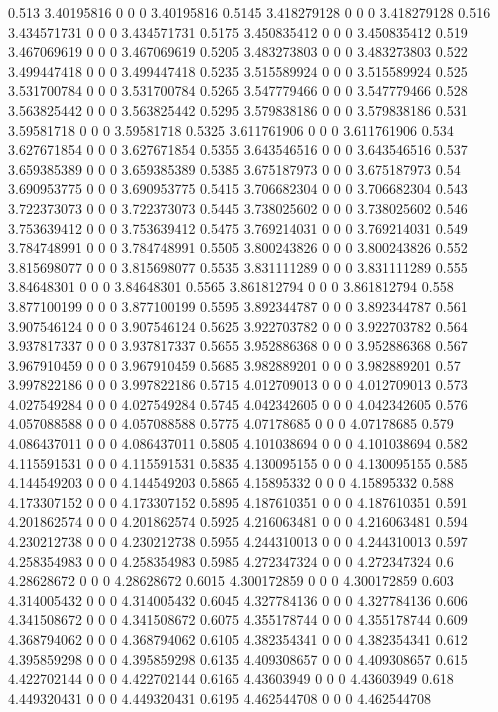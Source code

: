 {0.513 3.40195816 0 0 0 3.40195816
0.5145 3.418279128 0 0 0 3.418279128
0.516 3.434571731 0 0 0 3.434571731
0.5175 3.450835412 0 0 0 3.450835412
0.519 3.467069619 0 0 0 3.467069619
0.5205 3.483273803 0 0 0 3.483273803
0.522 3.499447418 0 0 0 3.499447418
0.5235 3.515589924 0 0 0 3.515589924
0.525 3.531700784 0 0 0 3.531700784
0.5265 3.547779466 0 0 0 3.547779466
0.528 3.563825442 0 0 0 3.563825442
0.5295 3.579838186 0 0 0 3.579838186
0.531 3.59581718 0 0 0 3.59581718
0.5325 3.611761906 0 0 0 3.611761906
0.534 3.627671854 0 0 0 3.627671854
0.5355 3.643546516 0 0 0 3.643546516
0.537 3.659385389 0 0 0 3.659385389
0.5385 3.675187973 0 0 0 3.675187973
0.54 3.690953775 0 0 0 3.690953775
0.5415 3.706682304 0 0 0 3.706682304
0.543 3.722373073 0 0 0 3.722373073
0.5445 3.738025602 0 0 0 3.738025602
0.546 3.753639412 0 0 0 3.753639412
0.5475 3.769214031 0 0 0 3.769214031
0.549 3.784748991 0 0 0 3.784748991
0.5505 3.800243826 0 0 0 3.800243826
0.552 3.815698077 0 0 0 3.815698077
0.5535 3.831111289 0 0 0 3.831111289
0.555 3.84648301 0 0 0 3.84648301
0.5565 3.861812794 0 0 0 3.861812794
0.558 3.877100199 0 0 0 3.877100199
0.5595 3.892344787 0 0 0 3.892344787
0.561 3.907546124 0 0 0 3.907546124
0.5625 3.922703782 0 0 0 3.922703782
0.564 3.937817337 0 0 0 3.937817337
0.5655 3.952886368 0 0 0 3.952886368
0.567 3.967910459 0 0 0 3.967910459
0.5685 3.982889201 0 0 0 3.982889201
0.57 3.997822186 0 0 0 3.997822186
0.5715 4.012709013 0 0 0 4.012709013
0.573 4.027549284 0 0 0 4.027549284
0.5745 4.042342605 0 0 0 4.042342605
0.576 4.057088588 0 0 0 4.057088588
0.5775 4.07178685 0 0 0 4.07178685
0.579 4.086437011 0 0 0 4.086437011
0.5805 4.101038694 0 0 0 4.101038694
0.582 4.115591531 0 0 0 4.115591531
0.5835 4.130095155 0 0 0 4.130095155
0.585 4.144549203 0 0 0 4.144549203
0.5865 4.15895332 0 0 0 4.15895332
0.588 4.173307152 0 0 0 4.173307152
0.5895 4.187610351 0 0 0 4.187610351
0.591 4.201862574 0 0 0 4.201862574
0.5925 4.216063481 0 0 0 4.216063481
0.594 4.230212738 0 0 0 4.230212738
0.5955 4.244310013 0 0 0 4.244310013
0.597 4.258354983 0 0 0 4.258354983
0.5985 4.272347324 0 0 0 4.272347324
0.6 4.28628672 0 0 0 4.28628672
0.6015 4.300172859 0 0 0 4.300172859
0.603 4.314005432 0 0 0 4.314005432
0.6045 4.327784136 0 0 0 4.327784136
0.606 4.341508672 0 0 0 4.341508672
0.6075 4.355178744 0 0 0 4.355178744
0.609 4.368794062 0 0 0 4.368794062
0.6105 4.382354341 0 0 0 4.382354341
0.612 4.395859298 0 0 0 4.395859298
0.6135 4.409308657 0 0 0 4.409308657
0.615 4.422702144 0 0 0 4.422702144
0.6165 4.43603949 0 0 0 4.43603949
0.618 4.449320431 0 0 0 4.449320431
0.6195 4.462544708 0 0 0 4.462544708
}
